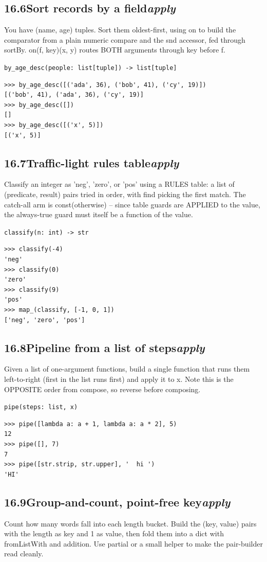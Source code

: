 \documentclass[10pt,letterpaper]{book}
\begin{document}
\subsection*{16.6\quad Sort records by a field\hfill\textnormal{\textit{apply}}}
You have (name, age) tuples. Sort them oldest-first, using on to build the comparator from a plain numeric compare and the snd accessor, fed through sortBy. on(f, key)(x, y) routes BOTH arguments through key before f.

\noindent\texttt{by\_age\_desc(people: list[tuple]) -> list[tuple]}
\begin{lstlisting}[style=ex]
>>> by_age_desc([('ada', 36), ('bob', 41), ('cy', 19)])
[('bob', 41), ('ada', 36), ('cy', 19)]
>>> by_age_desc([])
[]
>>> by_age_desc([('x', 5)])
[('x', 5)]
\end{lstlisting}
\subsection*{16.7\quad Traffic-light rules table\hfill\textnormal{\textit{apply}}}
Classify an integer as 'neg', 'zero', or 'pos' using a RULES table: a list of (predicate, result) pairs tried in order, with find picking the first match. The catch-all arm is const(otherwise) -- since table guards are APPLIED to the value, the always-true guard must itself be a function of the value.

\noindent\texttt{classify(n: int) -> str}
\begin{lstlisting}[style=ex]
>>> classify(-4)
'neg'
>>> classify(0)
'zero'
>>> classify(9)
'pos'
>>> map_(classify, [-1, 0, 1])
['neg', 'zero', 'pos']
\end{lstlisting}
\subsection*{16.8\quad Pipeline from a list of steps\hfill\textnormal{\textit{apply}}}
Given a list of one-argument functions, build a single function that runs them left-to-right (first in the list runs first) and apply it to x. Note this is the OPPOSITE order from compose, so reverse before composing.

\noindent\texttt{pipe(steps: list, x)}
\begin{lstlisting}[style=ex]
>>> pipe([lambda a: a + 1, lambda a: a * 2], 5)
12
>>> pipe([], 7)
7
>>> pipe([str.strip, str.upper], '  hi ')
'HI'
\end{lstlisting}
\subsection*{16.9\quad Group-and-count, point-free key\hfill\textnormal{\textit{apply}}}
Count how many words fall into each length bucket. Build the (key, value) pairs with the length as key and 1 as value, then fold them into a dict with fromListWith and addition. Use partial or a small helper to make the pair-builder read cleanly.
\end{document}
